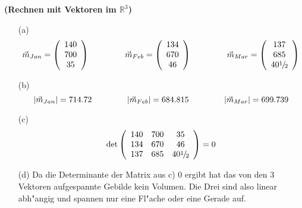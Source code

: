 \documentclass[11pt,a4paper,leqno]{article}
\begin{document}
\Kopf

\Uebungloes




\begin{Gruppenuebungen}


\Aufgabe %
\textbf{(Rechnen mit Vektoren im $\mathbb{R}^3$)}
\begin{itemize}

\item[(a)]
\[
\vec m _{Jan}  = \left( {\begin{array}{*{20}c}
   {140}  \\
   {700}  \\
   {35}  \\
\end{array}} \right) \hspace{1.5cm}
\vec m _{Feb}  = \left( {\begin{array}{*{20}c}
   {134}  \\
   {670}  \\
   {46}  \\
\end{array}} \right) \hspace{1.5cm}
\vec m _{Mar}  = \left( {\begin{array}{*{20}c}
   {137}  \\
   {685}  \\
   {40{\raise0.5ex\hbox{$\scriptstyle 1$}
\kern-0.1em/\kern-0.15em
\lower0.25ex\hbox{$\scriptstyle 2$}}}  \\
\end{array}} \right)
\]

\item[(b)]
$$
| \vec m_{Jan} | = 714.72 \hspace{1.5cm}
| \vec m_{Feb} | = 684.815 \hspace{1.5cm}
| \vec m_{Mar} | = 699.739
$$

\item[(c)]
\[
\det \left( {\begin{array}{*{20}c}
   {140} & {700} & {35}  \\
   {134} & {670} & {46}  \\
   {137} & {685} & {40{\raise0.5ex\hbox{$\scriptstyle 1$}
\kern-0.1em/\kern-0.15em
\lower0.25ex\hbox{$\scriptstyle 2$}}}  \\
\end{array}} \right) = 0
\]

\item[(d)]
Da die Determinante der Matrix aus c) $0$ ergibt hat das von den $3$ Vektoren aufgespannte Gebilde kein Volumen. Die Drei sind also linear abh"angig und spannen nur eine Fl"ache oder eine Gerade auf.
\end{itemize}


\end{Gruppenuebungen}
\end{document}
